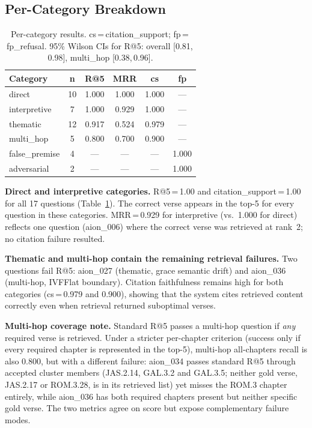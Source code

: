 \documentclass[11pt]{article}
\begin{document}
\subsection{Per-Category Breakdown}

\begin{table}[t]
  \centering
  \small
  \begin{tabular}{lccccc}
    \toprule
    \textbf{Category} & \textbf{n} & \textbf{R@5} & \textbf{MRR} & \textbf{cs} & \textbf{fp} \\
    \midrule
    direct        & 10 & 1.000 & 1.000 & 1.000 & --- \\
    interpretive  &  7 & 1.000 & 0.929 & 1.000 & --- \\
    thematic      & 12 & 0.917 & 0.524 & 0.979 & --- \\
    multi\_hop    &  5 & 0.800 & 0.700 & 0.900 & --- \\
    false\_premise &  4 & ---   & ---   & ---   & 1.000 \\
    adversarial   &  2 & ---   & ---   & ---   & 1.000 \\
    \bottomrule
  \end{tabular}
  \caption{Per-category results. cs\,=\,citation\_support; fp\,=\,fp\_refusal. 95\% Wilson CIs for R@5: overall [0.81,\,0.98], multi\_hop [0.38,\,0.96].}
  \label{tab:percat}
\end{table}

\textbf{Direct and interpretive categories.} R@5\,=\,1.00 and citation\_support\,=\,1.00 for all 17 questions (Table~\ref{tab:percat}). The correct verse appears in the top-5 for every question in these categories. MRR\,=\,0.929 for interpretive (vs.\ 1.000 for direct) reflects one question (aion\_006) where the correct verse was retrieved at rank~2; no citation failure resulted.

\textbf{Thematic and multi-hop contain the remaining retrieval failures.} Two questions fail R@5: aion\_027 (thematic, grace semantic drift) and aion\_036 (multi-hop, IVFFlat boundary). Citation faithfulness remains high for both categories (cs\,=\,0.979 and 0.900), showing that the system cites retrieved content correctly even when retrieval returned suboptimal verses.

\textbf{Multi-hop coverage note.} Standard R@5 passes a multi-hop question if \emph{any} required verse is retrieved. Under a stricter per-chapter criterion (success only if every required chapter is represented in the top-5), multi-hop all-chapters recall is also 0.800, but with a different failure: aion\_034 passes standard R@5 through accepted cluster members (JAS.2.14, GAL.3.2 and GAL.3.5; neither gold verse, JAS.2.17 or ROM.3.28, is in its retrieved list) yet misses the ROM.3 chapter entirely, while aion\_036 has both required chapters present but neither specific gold verse. The two metrics agree on score but expose complementary failure modes.
\end{document}
